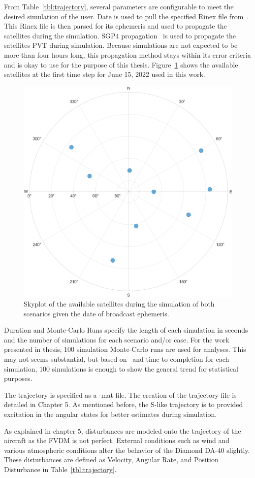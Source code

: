 From Table~\ref{tbl:trajectory}, several parameters are configurable to meet the desired simulation of the user. Date is used to pull the specified Rinex file from~\cite{CDDIS}. This Rinex file is then parsed for its ephemeris and used to propagate the satellites during the simulation. SGP4 propagation~\cite{} is used to propagate the satellites PVT during simulation. Because simulations are not expected to be more than four hours long, this propagation method stays within its error criteria and is okay to use for the purpose of this thesis. Figure~\ref{fig:skyplot} shows the available satellites at the first time step for June 15, 2022 used in this work.

\begin{figure}[!ht]
    \centering
    \includegraphics[width=0.4\linewidth]{Figures/Results/skyplot.png}
    \caption{Skyplot of the available satellites during the simulation of both scenarios given the date of broadcast ephemeris.}\label{fig:skyplot}
\end{figure}

Duration and Monte-Carlo Runs specify the length of each simulation in seconds and the number of simulations for each scenario and/or case. For the work presented in thesis, 100 simulation Monte-Carlo runs are used for analyses. This may not seems substantial, but based on~\cite{khaghaniAssessmentVDMbasedAutonomous2018,khaghaniAutonomousVehicleDynamic2016,mwenegohaModelbasedTightlyCoupled2020} and time to completion for each simulation, 100 simulations is enough to show the general trend for statistical purposes.

The trajectory is specified as a -mat file. The creation of the trajectory file is detailed in Chapter 5. As mentioned before, the S-like trajectory is to provided excitation in the angular states for better estimates during simulation. 

As explained in chapter 5, disturbances are modeled onto the trajectory of the aircraft as the FVDM is not perfect. External conditions such as wind and various atmospheric conditions alter the behavior of the Diamond DA-40 slightly. These disturbances are defined as Velocity, Angular Rate, and Position Disturbance in Table~\ref{tbl:trajectory}.

